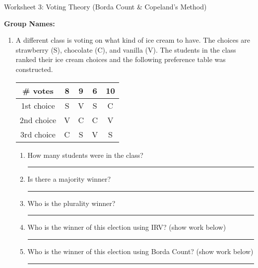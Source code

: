 \documentclass[12pt]{article}
\newcommand{\ans}[1][1in]{\rule{#1}{.5pt}}
\begin{document}
\begin{center}
{\Large  Worksheet 3:  Voting Theory (Borda Count \& Copeland's Method)	 	}
\end{center}



\noindent \textbf{Group Names:} \hrulefill \\
\begin{enumerate}     

\item A different class is voting on what kind of ice cream to have. The choices are strawberry (S), chocolate (C), and vanilla (V). The students in the class ranked their ice cream choices and the following preference table was constructed. 

\begingroup %
\renewcommand{\arraystretch}{2} %
    \begin{tabular}{| c  | c | c  | c  | c |} \hline
    \# votes & 8&9&6&10\\ \hline \hline
1st choice & S& V& S & C\\ \hline
2nd choice &  V &C &  C&V\\ \hline
3rd choice & C & S& V  & S\\ \hline
\end{tabular}
\endgroup 





\begin{enumerate}
\item How many students were in the class? \ans
\item Is there a majority winner? \ans
\item Who is the plurality winner? \ans
\item Who is the winner of this election using IRV? (show work below) \ans 
\vfill

\item Who is the winner of this election using Borda Count? (show work below) \ans



\vfill



\newpage  


\end{enumerate}
\end{enumerate}
\end{document}
